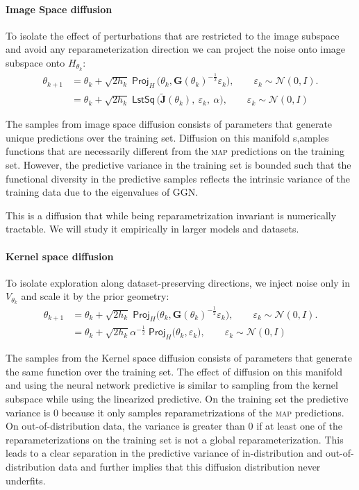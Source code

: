 \paragraph{Image Space diffusion}
To isolate the effect of perturbations that are restricted to the image subspace and avoid any reparameterization direction we can project the noise onto image subspace onto $H_{\theta_k}$:
\begin{align}
\label{eq:image_diffusion_em_primitive}
\theta_{k+1}
&=
\theta_k
+
\sqrt{2h_k}\;\textsf{Proj}_H\,\Big(\theta_k,\mathbf{G}(\theta_k)^{-\frac{1}{2}}\!\varepsilon_k\Big),
\qquad
\varepsilon_k\sim\mathcal N(0,I). \\
&=
\theta_k
+
\sqrt{2 h_k}\;\textsf{LstSq}\,\Big(\tilde{\mathbf{J}}(\theta_k),\ \varepsilon_k, \ \alpha\Big),
\qquad
\varepsilon_k\sim\mathcal N(0,I)
\end{align}

The samples from image space diffusion consists of parameters that generate unique predictions over the training set. Diffusion on this manifold s,amples functions that are necessarily different from the \textsc{map} predictions on the training set. However, the predictive variance in the training set is bounded such that the functional diversity in the predictive samples reflects the intrinsic variance of the training data due to the eigenvalues of $\textrm{GGN}$. 

This is a diffusion that while being reparametrization invariant is numerically tractable. We will study it empirically in larger models and datasets.

\paragraph{Kernel space diffusion}
To isolate exploration along dataset-preserving directions, we inject noise only in $V_{\theta_k}$ and scale
it by the prior geometry:
\begin{align}
\label{eq:image_diffusion_em_primitive}
\theta_{k+1}
&=
\theta_k
+
\sqrt{2h_k}\;\textsf{Proj}_H\!\Big(\theta_k,\mathbf{G}(\theta_k)^{-\frac{1}{2}}\!\varepsilon_k\Big),
\qquad
\varepsilon_k\sim\mathcal N(0,I). \\
&=
\theta_k
+
\sqrt{2 h_k}\alpha^{-\frac{1}{2}}\; \textsf{Proj}_H\!\Big(\theta_k,\varepsilon_k\Big),
\qquad
\varepsilon_k\sim\mathcal N(0,I)
\end{align}

The samples from the Kernel space diffusion consists of parameters that generate the same function over the training set. The effect of diffusion on this manifold and using the neural network predictive is similar to sampling from the kernel subspace while using the linearized predictive. On the training set the predictive variance is $0$ because it only samples reparametrizations of the \textsc{map} predictions. On out-of-distribution data, the variance is greater than $0$ if at least one of the reparameterizations on the training set is not a global reparameterization. This leads to a clear separation in the predictive variance of in-distribution and out-of-distribution data and further implies that this diffusion distribution never underfits.



